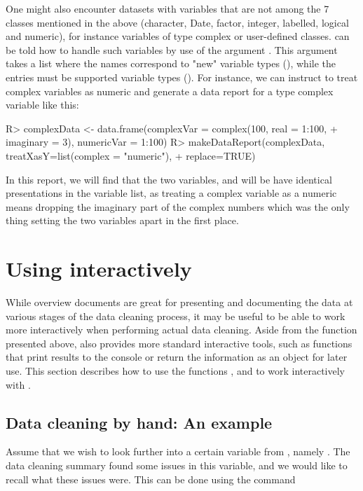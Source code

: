 \documentclass[article,shortnames]{jss}
\begin{document}
One might also encounter datasets with variables that are not among the 7 classes mentioned in the above (character, Date, factor, integer, labelled, logical and numeric), for instance variables of type complex or user-defined classes.  can be told how to handle such variables by use of the argument . This argument takes a list where the names correspond to "new" variable types (), while the entries must be supported variable types (). For instance, we can instruct  to treat complex variables as numeric and generate a data report for a type complex variable like this:

\begin{Schunk}
\begin{Sinput}
R> complexData <- data.frame(complexVar = complex(100, real = 1:100, 
+    imaginary = 3), numericVar = 1:100)
R> makeDataReport(complexData, treatXasY=list(complex = "numeric"), 
+    replace=TRUE)
\end{Sinput}
\end{Schunk}

In this report, we will find that the two variables,  and  will be have identical presentations in the variable list, as treating a complex variable as a numeric means dropping the imaginary part of the complex numbers which was the only thing setting the two variables apart in the first place.  


\section[Using dataMaid interactively]{Using  interactively}
\label{sec:interactiveCleanR}

While overview documents are great for presenting and documenting the data at various stages 
of the data cleaning process, it may be useful to be able to work more
interactively when performing actual data cleaning. Aside from
the  function presented above,  also
provides more standard  interactive tools, such as
functions that print results to the console or return the information
as an object for later use. This section describes how to use the
functions ,  and  to
work interactively with .

\subsection{Data cleaning by hand: An example}
Assume that we wish to look further into a certain variable from
, namely . The data cleaning summary found some
issues in this variable, and we would like to recall what these issues
were. This can be done using the  command
\end{document}
